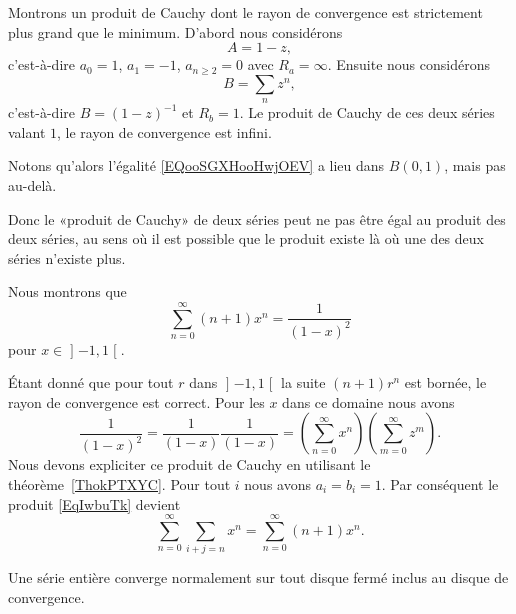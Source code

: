 \begin{example}
    Montrons un produit de Cauchy dont le rayon de convergence est strictement plus grand que le minimum. D'abord nous considérons
    \begin{equation}
        A=1-z,
    \end{equation}
    c'est-à-dire \( a_0=1\), \( a_1=-1\), \( a_{n\geq 2}=0\) avec \( R_a=\infty\). Ensuite nous considérons
    \begin{equation}
        B=\sum_nz^n,
    \end{equation}
    c'est-à-dire \( B=(1-z)^{-1}\) et \( R_b=1\). Le produit de Cauchy de ces deux séries valant \( 1\), le rayon de convergence est infini.

    Notons qu'alors l'égalité \eqref{EQooSGXHooHwjOEV} a lieu dans \( B(0,1)\), mais pas au-delà.

    Donc le «produit de Cauchy» de deux séries peut ne pas être égal au produit des deux séries, au sens où il est possible que le produit existe là où une des deux séries n'existe plus.
\end{example}

\begin{example}
    Nous montrons que
    \begin{equation}
        \sum_{n=0}^{\infty}(n+1)x^n=\frac{1}{ (1-x)^2 }
    \end{equation}
    pour \( x\in\mathopen] -1 , 1 \mathclose[\).

    Étant donné que pour tout \( r\) dans \( \mathopen] -1 , 1 \mathclose[\) la suite \( (n+1)r^n\) est bornée, le rayon de convergence est correct. Pour les \( x\) dans ce domaine nous avons
    \begin{equation}        \label{EqIwbuTk}
        \frac{1}{ (1-x)^2 }=\frac{1}{ (1-x) }\frac{1}{ (1-x) }=\left( \sum_{n=0}^{\infty}x^n \right)\left( \sum_{m=0}^{\infty}z^m \right).
    \end{equation}
    Nous devons expliciter ce produit de Cauchy en utilisant le théorème~\ref{ThokPTXYC}. Pour tout \( i\) nous avons \( a_i=b_i=1\). Par conséquent le produit \eqref{EqIwbuTk} devient
    \begin{equation}
        \sum_{n=0}^{\infty}\sum_{i+j=n}x^n=\sum_{n=0}^{\infty}(n+1)x^n.
    \end{equation}
\end{example}

\begin{theorem}
    Une série entière converge normalement sur tout disque fermé inclus au disque de convergence.
\end{theorem}

